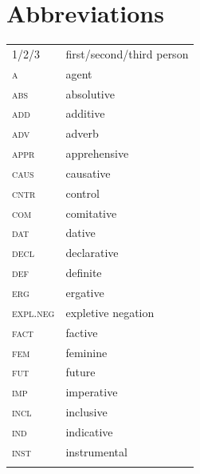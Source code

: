 \documentclass[output=paper,colorlinks,citecolor=brown]{langscibook}
\begin{document}
\section*{Abbreviations}
\begin{tabularx}{.5\textwidth}{@{}lQ@{}}
1/2/3 & first/second/third person \\
\textsc{a} & agent \\
\textsc{abs} & absolutive \\
\textsc{add} & additive \\
\textsc{adv} & adverb \\
\textsc{appr} & apprehensive \\
\textsc{caus} & causative \\
\textsc{cntr} & control \\
\textsc{com} & comitative \\
\textsc{dat} & dative \\
\textsc{decl} & declarative \\
\textsc{def} & definite \\
\textsc{erg} & ergative \\
\textsc{expl.neg} & expletive negation \\
\textsc{fact} & factive \\
\textsc{fem} & feminine \\
\textsc{fut} & future \\
\textsc{imp} & imperative \\
\textsc{incl} & inclusive \\
\textsc{ind} & indicative \\
\textsc{inst} & instrumental \\\\
\end{tabularx}%
\end{document}

